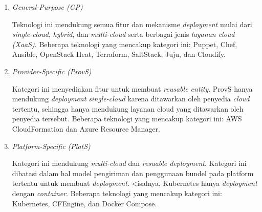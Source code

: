 \begin{enumerate}
  \item \textit{General-Purpose (GP)}

        Teknologi ini mendukung semua fitur dan mekanisme \textit{deployment} mulai dari \textit{single-cloud}, \textit{hybrid}, dan \textit{multi-cloud} serta berbagai jenis \textit{layanan cloud (XaaS)}. Beberapa teknologi yang mencakup kategori ini: Puppet, Chef, Ansible, OpenStack Heat, Terraform, SaltStack, Juju, dan Cloudify.

  \item \textit{Provider-Specific (ProvS)}

        Kategori ini menyediakan fitur untuk membuat \textit{reusable entity}. ProvS hanya mendukung \textit{deployment single-cloud} karena ditawarkan oleh penyedia \textit{cloud} tertentu, sehingga hanya mendukung layanan cloud yang ditawarkan oleh penyedia tersebut. Beberapa teknologi yang mencakup kategori ini: AWS CloudFormation dan Azure Resource Manager.

  \item \textit{Platform-Specific (PlatS)}

        Kategori ini mendukung \textit{multi-cloud} dan \textit{resuable deployment}. Kategori ini dibatasi dalam hal model pengiriman dan penggunaan bundel pada platform tertentu untuk membuat \textit{deployment}. <isalnya, Kubernetes hanya \textit{deployment} dengan \textit{container}. Beberapa teknologi yang mencakup kategori ini: Kubernetes, CFEngine, dan Docker Compose.

\end{enumerate}